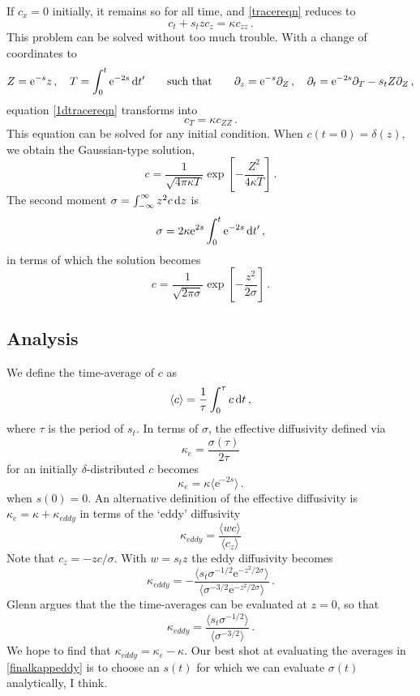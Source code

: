 \documentclass[11pt, oneside]{article}
\newcommand{\com}		{\, ,}
\newcommand{\per}		{\, .}
\newcommand{\beq}		{\begin{equation}}
\newcommand{\eeq}		{\end{equation}}
\newcommand{\p}		{\partial}
\newcommand{\kap}{\kappa}
\newcommand{\ee}	{\mathrm{e}}
\newcommand{\id}	{{\, \rm d}}
\begin{document}
If $c_x = 0$ initially, it remains so for all time, and \eqref{tracereqn} reduces to
\beq
c_t + s_t z c_z = \kap c_{zz} \per
\label{1dtracereqn}
\eeq
This problem can be solved without too much trouble. With a change of coordinates to
\beq
Z =  \ee^{-s} z \com \quad T =  \int_0^t \ee^{-2s} \id t'
\qquad \text{such that} \qquad 
\p_z = \ee^{-s} \p_Z \com \quad \p_t = \ee^{-2s} \p_T - s_t Z \p_Z \com
\eeq
equation \eqref{1dtracereqn} transforms into
\beq
c_{T} = \kappa c_{ZZ} \per
\eeq
This equation can be solved for any initial condition. When $c(t=0) = \delta(z)$, we obtain the Gaussian-type solution,
\beq
c = \frac{1}{\sqrt{4 \pi \kappa T}} \exp \left [ - \frac{Z^2}{4 \kappa T} \right ] \per
\label{gaussianlike}
\eeq
The second moment $\sigma = \int_{-\infty}^\infty z^2 c \id z$ is 
\beq
\sigma = 2 \kappa \ee^{2 s} \int_0^t \ee^{-2 s} \id t' \com
\eeq
in terms of which the solution becomes
\beq
c = \frac{1}{\sqrt{2 \pi \sigma}} \exp \left [ - \frac{z^2}{2 \sigma} \right ] \per
\eeq

\subsection{Analysis}

We define the time-average of $c$ as
\beq
\langle c \rangle = \frac{1}{\tau} \int_0^\tau c \id t \com
\eeq
where $\tau$ is the period of $s_t$. In terms of $\sigma$, the effective diffusivity defined via
\beq
\kappa_e = \frac{\sigma(\tau)}{2 \tau}
\eeq
for an initially $\delta$-distributed $c$ becomes
\beq
\kappa_e = \kappa \langle \ee^{-2 s} \rangle \per
\eeq
when $s(0) = 0$.  An alternative definition of the effective diffusivity is $\kappa_e = \kappa + \kappa_{eddy}$ in terms of the `eddy' diffusivity
\beq
\kappa_{eddy} = \frac{\langle w c \rangle}{\langle c_z \rangle}
\eeq
Note that $c_z = - z c / \sigma$. With $w=s_t z$ the eddy diffusivity becomes
\beq
\kappa_{eddy} = - \frac{ \langle s_t \sigma^{-1/2} \ee^{-z^2/2 \sigma} \rangle}{\langle \sigma^{-3/2} \ee^{-z^2/2 \sigma} \rangle } \per
\eeq
Glenn argues that the the time-averages can be evaluated at $z=0$, so that 
\beq
\kappa_{eddy} =  \frac{ \langle s_t \sigma^{-1/2} \rangle}{\langle \sigma^{-3/2} \rangle} \per
\label{finalkappeddy}
\eeq
We hope to find that $\kappa_{eddy} = \kappa_e - \kappa$. Our best shot at evaluating the averages in \eqref{finalkappeddy} is to choose an $s(t)$ for which we can evaluate $\sigma(t)$ analytically, I think.
\end{document}
